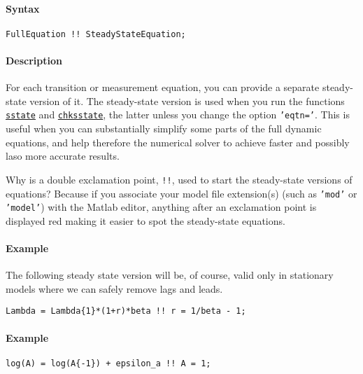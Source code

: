 


	\paragraph{Syntax}

\begin{verbatim}
FullEquation !! SteadyStateEquation;
\end{verbatim}

\paragraph{Description}

For each transition or measurement equation, you can provide a separate
steady-state version of it. The steady-state version is used when you
run the functions \href{model/sstate}{\texttt{sstate}} and
\href{model/chksstate}{\texttt{chksstate}}, the latter unless you change
the option \texttt{'eqtn='}. This is useful when you can substantially
simplify some parts of the full dynamic equations, and help therefore
the numerical solver to achieve faster and possibly laso more accurate
results.

Why is a double exclamation point, \texttt{!!}, used to start the
steady-state versions of equations? Because if you associate your model
file extension(s) (such as \texttt{'mod'} or \texttt{'model'}) with the
Matlab editor, anything after an exclamation point is displayed red
making it easier to spot the steady-state equations.

\paragraph{Example}

The following steady state version will be, of course, valid only in
stationary models where we can safely remove lags and leads.

\begin{verbatim}
Lambda = Lambda{1}*(1+r)*beta !! r = 1/beta - 1;
\end{verbatim}

\paragraph{Example}

\begin{verbatim}
log(A) = log(A{-1}) + epsilon_a !! A = 1;
\end{verbatim}


